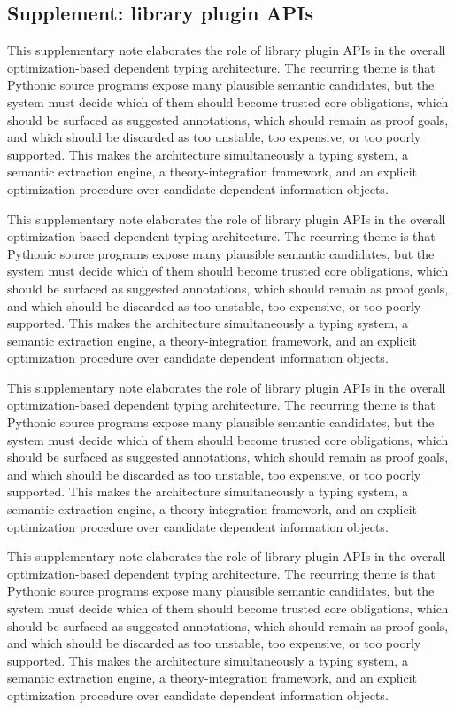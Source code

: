 \documentclass[11pt]{article}
\theoremstyle{definition}
\theoremstyle{plain}
\begin{document}
\subsection{Supplement: library plugin APIs}
This supplementary note elaborates the role of library plugin APIs in the overall
optimization-based dependent typing architecture. The recurring theme is that
Pythonic source programs expose many plausible semantic candidates, but the
system must decide which of them should become trusted core obligations, which
should be surfaced as suggested annotations, which should remain as proof
goals, and which should be discarded as too unstable, too expensive, or too
poorly supported. This makes the architecture simultaneously a typing system,
a semantic extraction engine, a theory-integration framework, and an explicit
optimization procedure over candidate dependent information objects.

This supplementary note elaborates the role of library plugin APIs in the overall
optimization-based dependent typing architecture. The recurring theme is that
Pythonic source programs expose many plausible semantic candidates, but the
system must decide which of them should become trusted core obligations, which
should be surfaced as suggested annotations, which should remain as proof
goals, and which should be discarded as too unstable, too expensive, or too
poorly supported. This makes the architecture simultaneously a typing system,
a semantic extraction engine, a theory-integration framework, and an explicit
optimization procedure over candidate dependent information objects.

This supplementary note elaborates the role of library plugin APIs in the overall
optimization-based dependent typing architecture. The recurring theme is that
Pythonic source programs expose many plausible semantic candidates, but the
system must decide which of them should become trusted core obligations, which
should be surfaced as suggested annotations, which should remain as proof
goals, and which should be discarded as too unstable, too expensive, or too
poorly supported. This makes the architecture simultaneously a typing system,
a semantic extraction engine, a theory-integration framework, and an explicit
optimization procedure over candidate dependent information objects.

This supplementary note elaborates the role of library plugin APIs in the overall
optimization-based dependent typing architecture. The recurring theme is that
Pythonic source programs expose many plausible semantic candidates, but the
system must decide which of them should become trusted core obligations, which
should be surfaced as suggested annotations, which should remain as proof
goals, and which should be discarded as too unstable, too expensive, or too
poorly supported. This makes the architecture simultaneously a typing system,
a semantic extraction engine, a theory-integration framework, and an explicit
optimization procedure over candidate dependent information objects.
\end{document}
